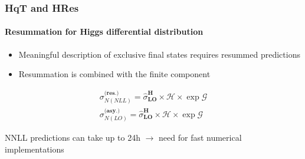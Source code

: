 \documentclass[aspectratio=43]{beamer}
\begin{document}
\begin{frame}
	
	\frametitle{HqT and HRes}
	\framesubtitle{Resummation for Higgs differential distribution}

	\footnotesize
	
	\begin{itemize}
	\item Meaningful description of exclusive final states requires resummed predictions
	\item Resummation is combined with the finite component
	
	\end{itemize}

	\begin{align}
		\sigma^{\textbf{(res.)}}_{N(NLL)} = \hat{\sigma}^{\textbf{H}}_{\textbf{LO}} \times \mathcal{H} \times \exp{\mathcal{G}} \nonumber \\
		\sigma^{\textbf{(asy.)}}_{N(LO)} = \hat{\sigma}^{\textbf{H}}_{\textbf{LO}} \times \mathcal{H} \times \exp{\mathcal{G}} \nonumber
	\end{align}
	
	NNLL predictions can take up to 24h $\longrightarrow$ need for {\color{red} fast numerical implementations}
	
\end{frame}
\end{document}
